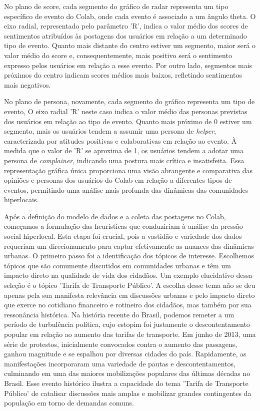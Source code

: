 No plano de score, cada segmento do gráfico de radar representa um tipo específico de evento do Colab, onde cada evento é associado a um ângulo theta. O eixo radial, representado pelo parâmetro 'R', indica o valor médio dos scores de sentimentos atribuídos às postagens dos usuários em relação a um determinado tipo de evento. Quanto mais distante do centro estiver um segmento, maior será o valor médio do score e, consequentemente, mais positivo será o sentimento expresso pelos usuários em relação a esse evento. Por outro lado, segmentos mais próximos do centro indicam scores médios mais baixos, refletindo sentimentos mais negativos.

No plano de persona, novamente, cada segmento do gráfico representa um tipo de evento, O eixo radial 'R' neste caso indica o valor médio das personas previstas dos usuários em relação ao tipo de evento. Quanto mais próximo de 0 estiver um segmento, mais os usuários tendem a assumir uma persona de \textit{helper}, caracterizada por atitudes positivas e colaborativas em relação ao evento. À medida que o valor de 'R' se aproxima de 1, os usuários tendem a adotar uma persona de \textit{complainer}, indicando uma postura mais crítica e insatisfeita. Essa representação gráfica única proporciona uma visão abrangente e comparativa das opiniões e personas dos usuários do Colab em relação a diferentes tipos de eventos, permitindo uma análise mais profunda das dinâmicas das comunidades hiperlocais.

Após a definição do modelo de dados e a coleta das postagens no Colab, começamos a formulação das heurísticas que conduziriam à análise da pressão social hiperlocal. Esta etapa foi crucial, pois a vastidão e variedade dos dados requeriam um direcionamento para captar efetivamente as nuances das dinâmicas urbanas. O primeiro passo foi a identificação dos tópicos de interesse. Escolhemos tópicos que são comumente discutidos em comunidades urbanas e têm um impacto direto na qualidade de vida dos cidadãos. Um exemplo elucidativo dessa seleção é o tópico 'Tarifa de Transporte Público'. A escolha desse tema não se deu apenas pela sua manifesta relevância em discussões urbanas e pelo impacto direto que exerce no cotidiano financeiro e rotineiro dos cidadãos, mas também por sua ressonância histórica. Na história recente do Brasil, podemos remeter a um período de turbulência política, cujo estopim foi justamente o descontentamento popular em relação ao aumento das tarifas de transporte. Em junho de 2013, uma série de protestos, inicialmente convocados contra o aumento das passagens, ganhou magnitude e se espalhou por diversas cidades do país. Rapidamente, as manifestações incorporaram uma variedade de pautas e descontentamentos, culminando em uma das maiores mobilizações populares das últimas décadas no Brasil. Esse evento histórico ilustra a capacidade do tema 'Tarifa de Transporte Público' de catalisar discussões mais amplas e mobilizar grandes contingentes da população em torno de demandas comuns.

